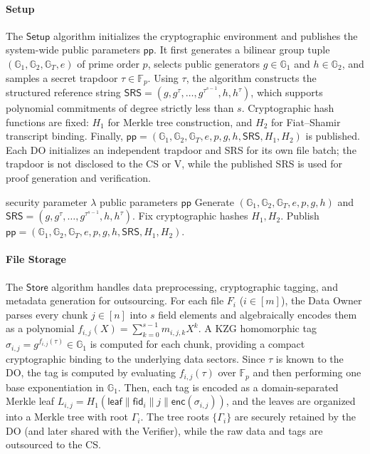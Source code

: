 \documentclass[lettersize,journal]{IEEEtran}
\newcommand{\GG}{\mathbb{G}}
\newcommand{\FF}{\mathbb{F}}
\newcommand{\SRS}{\mathsf{SRS}}
\newcommand{\Setup}{\mathsf{Setup}}
\newcommand{\Store}{\mathsf{Store}}
\begin{document}
\paragraph{\textbf{Setup}} 
The $\Setup$ algorithm initializes the cryptographic environment and publishes the system-wide public parameters $\mathsf{pp}$. It first generates a bilinear group tuple $(\GG_1, \GG_2, \GG_T, e)$ of prime order $p$, selects public generators $g \in \GG_1$ and $h \in \GG_2$, and samples a secret trapdoor $\tau \in \FF_p$. Using $\tau$, the algorithm constructs the structured reference string \(\SRS=(g,g^{\tau}, \dots, g^{\tau^{s-1}}, h, h^{\tau})\), which supports polynomial commitments of degree strictly less than $s$. Cryptographic hash functions are fixed: $H_1$ for Merkle tree construction, and $H_2$ for Fiat--Shamir transcript binding. Finally, $\mathsf{pp} = (\GG_1, \GG_2, \GG_T, e, p, g, h, \SRS, H_1, H_2)$ is published. Each DO initializes an independent trapdoor and SRS for its own file batch; the trapdoor is not disclosed to the CS or V, while the published SRS is used for proof generation and verification.
\begin{algorithm}[h]
\caption{$\Setup$}
\begin{algorithmic}[1]
\Require security parameter $\lambda$
\Ensure public parameters $\mathsf{pp}$
\State Generate $(\GG_1,\GG_2,\GG_T,e,p,g,h)$ and $\SRS=\left(g,g^\tau,\ldots,g^{\tau^{s-1}},h,h^\tau\right)$.
\State Fix cryptographic hashes $H_1, H_2$.
\State Publish
$
\mathsf{pp}=(\GG_1,\GG_2,\GG_T,e,p,g,h,\SRS, H_1,H_2).
$
\end{algorithmic}
\end{algorithm}


\paragraph{\textbf{File Storage}}
The $\Store$ algorithm handles data preprocessing, cryptographic tagging, and metadata generation for outsourcing. For each file $F_i$ ($i \in [m]$), the Data Owner parses every chunk $j \in [n]$ into $s$ field elements and algebraically encodes them as a polynomial $f_{i,j}(X) = \sum_{k=0}^{s-1} m_{i,j,k} X^k$. A KZG homomorphic tag $\sigma_{i,j} = g^{f_{i,j}(\tau)} \in \GG_1$ is computed for each chunk, providing a compact cryptographic binding to the underlying data sectors. Since \(\tau\) is known to the DO, the tag is computed by evaluating \(f_{i,j}(\tau)\) over \(\FF_p\) and then performing one base exponentiation in \(\GG_1\). 
Then, each tag is encoded as a domain-separated Merkle leaf $L_{i,j}=H_1(\mathsf{leaf}\|\mathsf{fid}_i\|j\|\mathsf{enc}(\sigma_{i,j}))$, and the leaves are organized into a Merkle tree with root $\Gamma_i$. The tree roots $\{\Gamma_i\}$ are securely retained by the DO (and later shared with the Verifier), while the raw data and tags are outsourced to the CS.
\end{document}
